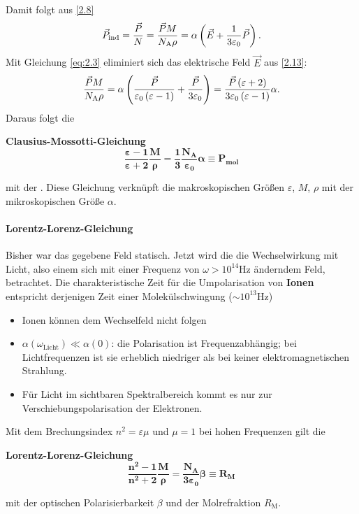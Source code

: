     Damit folgt aus \ref{2.8}
    \begin{equation}
    	\label{2.13}
    	\vec{P}_{\text{ind}} = \frac{\vec{P}}{N} = \frac{\vec{P} M}{N_\mathrm{A} \rho} = \alpha \left( \vec{E} + \frac{1}{3 \varepsilon_0} \vec{P} \right) .
    \end{equation} 
    Mit Gleichung \eqref{eq:2.3} eliminiert sich das elektrische Feld $ \vec{E}$ aus \ref{2.13}:
    $$
    \frac{\vec{P} M}{N_\mathrm{A} \rho} = \alpha \left( \frac{\vec{P}}{ \varepsilon_0 \left( \varepsilon -1 \right) } + \frac{\vec{P}}{3 \varepsilon_0} \right)  = \frac{\vec{P} \left( \varepsilon +2 \right) }{3 \varepsilon_0 \left( \varepsilon-1 \right) } \alpha.
    $$
    Daraus folgt die 
    \begin{important}
        \textbf{Clausius-Mossotti-Gleichung}\\
        \begin{equation}
            \bm{ \frac{ \varepsilon -1}{ \varepsilon +2} \frac{M}{ \rho} = \frac{1}{3} \frac{\text{N}_{\text{A}}}{ \varepsilon_0} \alpha \equiv P_{\text{mol}}}
            \label{eq:clausius_mossotti}
        \end{equation}
    \end{important}
    mit der . Diese Gleichung verknüpft die makroskopischen Größen $ \varepsilon$, $ M$, $ \rho$ mit der mikroskopischen Größe $ \alpha$.

\paragraph{Lorentz-Lorenz-Gleichung}
    Bisher war das gegebene Feld statisch. Jetzt wird die die Wechselwirkung mit Licht, also einem sich mit einer Frequenz von $ \omega > \si{10^{14} \hertz}$ änderndem Feld, betrachtet. Die charakteristische Zeit für die Umpolarisation von \textbf{Ionen} entspricht derjenigen Zeit einer Molekülschwingung ($\sim \si{10^{13}\hertz}$)
    \begin{itemize}[label= $\to$]
    	\item Ionen können dem Wechselfeld nicht folgen
    	\item $ \alpha \left( \omega_{\text{Licht}} \right) \ll \alpha \left( 0 \right)$: die Polarisation ist Frequenzabhängig; bei Lichtfrequenzen ist sie erheblich niedriger als bei keiner elektromagnetischen Strahlung.
    	\item Für Licht im sichtbaren Spektralbereich kommt es nur zur Verschiebungspolarisation der Elektronen.
    \end{itemize}
    Mit dem Brechungsindex $n^2 = \varepsilon \mu$ und $ \mu = 1$ bei hohen Frequenzen gilt die 
    \begin{important}
        \textbf{Lorentz-Lorenz-Gleichung}\\
        \begin{equation}
            \bm{\frac{n^2 -1}{n^2 +2} \frac{M}{ \rho} = \frac{\text{N}_{\text{A}}}{3 \varepsilon_0} \beta \equiv R_{\text{M}}}
        \end{equation}
    \end{important}
    mit der optischen Polarisierbarkeit $\beta$ und der Molrefraktion $R_{\text{M}}$.

